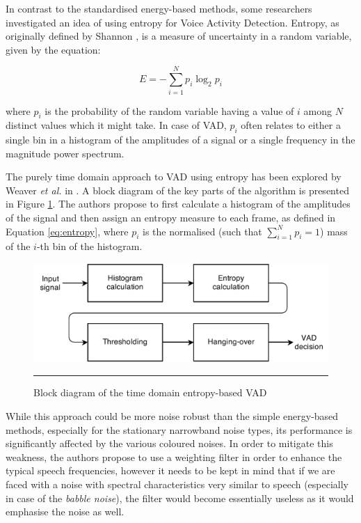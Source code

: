 In contrast to the standardised energy-based methods, some researchers investigated an idea of using entropy for Voice Activity Detection. Entropy, as originally defined by Shannon \cite{Shannon}, is a measure of uncertainty in a random variable, given by the equation:

\begin{equation}
E = - \sum_{i=1}^{N} p_i \log_2 p_i
\label{eq:entropy}
\end{equation}

where $p_i$ is the probability of the random variable having a value of $i$ among $N$ distinct values which it might take. In case of VAD, $p_i$ often relates to either a single bin in a histogram of the amplitudes of a signal or a single frequency in the magnitude power spectrum.

The purely time domain approach to VAD using entropy has been explored by Weaver \emph{et al.} in \cite{Weaver}. A block diagram of the key parts of the algorithm is presented in Figure \ref{fig:Weaver}. The authors propose to first calculate a histogram of the amplitudes of the signal and then assign an entropy measure to each frame, as defined in Equation \ref{eq:entropy}, where $p_i$ is the normalised (such that $\sum_{i=1}^{N} p_i = 1$) mass of the $i$-th bin of the histogram.

\begin{figure}[htbp]
	\centering
		\includegraphics[width=0.9\columnwidth]{Figures/Chapter2/Weaver.png}
		\rule{37em}{0.5pt}
	\caption[Block diagram of the time domain entropy-based VAD]{Block diagram of the time domain entropy-based VAD \cite{Weaver}}
	\label{fig:Weaver}
\end{figure}

While this approach could be more noise robust than the simple energy-based methods, especially for the stationary narrowband noise types, its performance is significantly affected by the various coloured noises. In order to mitigate this weakness, the authors propose to use a weighting filter in order to enhance the typical speech frequencies, however it needs to be kept in mind that if we are faced with a noise with spectral characteristics very similar to speech (especially in case of the \emph{babble noise}), the filter would become essentially useless as it would emphasise the noise as well.

